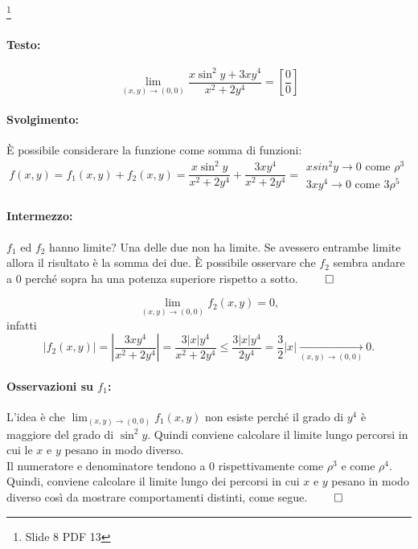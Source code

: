 \begin{example}\footnote{Slide 8 PDF 13}
	\paragraph{Testo:}
	\begin{equation*}
		\lim_{(x,y)\rightarrow(0,0)} \frac{x\sin^2y+3xy^4}{x^2+2y^4}=\left[\frac{0}{0}\right]
	\end{equation*}
	\paragraph{Svolgimento:} È possibile considerare la funzione come somma di funzioni:
	\begin{equation*}
		f(x,y)=f_1(x,y)+f_2(x,y) = \frac{x\sin^2y}{x^2+2y^4} + \frac{3xy^4}{x^2+2y^4} = 
		\begin{matrix}
			xsin^2y\rightarrow 0 \text{ come } \rho^3\\
			3xy^4\rightarrow 0 \text{ come } 3\rho^5
		\end{matrix}
	\end{equation*}
	
	\paragraph{Intermezzo:} $f_1$ ed $f_2$ hanno limite? Una delle due non ha limite. Se avessero entrambe limite allora il risultato è la somma dei due. È possibile osservare che $f_2$ sembra andare a 0 perché sopra ha una potenza superiore rispetto a sotto. $\qed$
	
	\begin{equation*}
		\lim_{(x,y)\rightarrow(0,0)} f_2(x,y) = 0,
	\end{equation*}
	infatti
	\begin{equation*}
		|f_2(x,y)|=\left|\frac{3xy^4}{x^2+2y^4}\right| = \frac{3|x|y^4}{x^2+2y^4} \leq \frac{3|x|y^4}{2y^4}=\frac{3}{2}|x|\underset{(x,y)\rightarrow(0,0)}{\longrightarrow} 0.
	\end{equation*}
	
	\paragraph{Osservazioni su $f_1$:} L'idea è che $	\lim_{(x,y)\rightarrow(0,0)} f_1(x,y)$ non esiste perché il grado di $y^4$ è maggiore del grado di $\sin^2y$. Quindi conviene calcolare il limite lungo percorsi in cui le $x$ e $y$ pesano in modo diverso.\\
	Il numeratore e denominatore tendono a 0 rispettivamente come $\rho^3$ e come $\rho^4$. Quindi, conviene calcolare il limite lungo dei percorsi in cui $x$ e $y$ pesano in modo diverso così da mostrare comportamenti distinti, come segue. $\qed$


\end{example}
